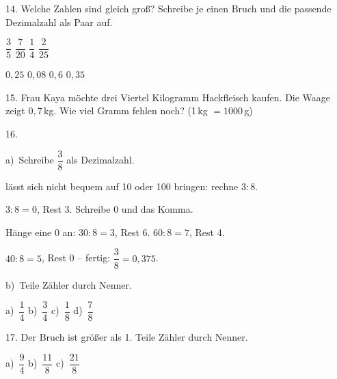 \documentclass[11pt]{article}
\newcommand{\grau}[1]{{\color{mbgrau}#1}}
\begin{document}
\begin{pfaufg}{}{14.}{}
Welche Zahlen sind gleich groß? Schreibe je einen Bruch und die passende Dezimalzahl als Paar auf. \par\vspace{3pt} $\dfrac{3}{5}$ \qquad $\dfrac{7}{20}$ \qquad $\dfrac{1}{4}$ \qquad $\dfrac{2}{25}$ \par\vspace{6pt} $0{,}25$ \qquad $0{,}08$ \qquad $0{,}6$ \qquad $0{,}35$
\end{pfaufg}

\begin{pfaufg}{}{15.}{}
Frau Kaya möchte drei Viertel Kilogramm Hackfleisch kaufen. Die Waage zeigt $0{,}7$\,kg. Wie viel Gramm fehlen noch? (1\,kg $= 1000$\,g)
\end{pfaufg}

\begin{pfaufg}{}{16.}{}
\grau{a)\ Schreibe $\dfrac{3}{8}$ als Dezimalzahl.\par\smallskip 8 lässt sich nicht bequem auf 10 oder 100 bringen: rechne $3 : 8$.\par $3 : 8 = 0$, Rest 3. Schreibe 0 und das Komma.\par Hänge eine 0 an: $30 : 8 = 3$, Rest 6. \quad $60 : 8 = 7$, Rest 4.\par $40 : 8 = 5$, Rest 0 – fertig: $\dfrac{3}{8} = 0{,}375$.}
\par\medskip
b)\ Teile Zähler durch Nenner. \par\vspace{3pt} a)~$\dfrac{1}{4}$ \qquad b)~$\dfrac{3}{4}$ \qquad c)~$\dfrac{1}{8}$ \qquad d)~$\dfrac{7}{8}$
\end{pfaufg}

\begin{pfaufg}{}{17.}{}
Der Bruch ist größer als 1. Teile Zähler durch Nenner. \par\vspace{3pt} a)~$\dfrac{9}{4}$ \qquad b)~$\dfrac{11}{8}$ \qquad c)~$\dfrac{21}{8}$
\end{pfaufg}
\end{document}

